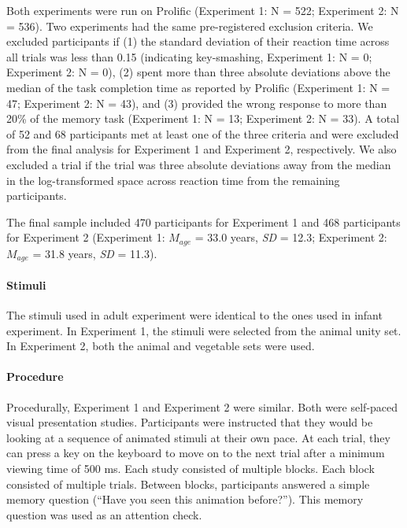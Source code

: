 \documentclass[
]{article}
\begin{document}
Both experiments were run on Prolific (Experiment 1: N = 522; Experiment 2: N = 536). Two experiments had the same pre-registered exclusion criteria. We excluded participants if (1) the standard deviation of their reaction time across all trials was less than 0.15 (indicating key-smashing, Experiment 1: N = 0; Experiment 2: N = 0), (2) spent more than three absolute deviations above the median of the task completion time as reported by Prolific (Experiment 1: N = 47; Experiment 2: N = 43), and (3) provided the wrong response to more than 20\% of the memory task (Experiment 1: N = 13; Experiment 2: N = 33). A total of 52 and 68 participants met at least one of the three criteria and were excluded from the final analysis for Experiment 1 and Experiment 2, respectively. We also excluded a trial if the trial was three absolute deviations away from the median in the log-transformed space across reaction time from the remaining participants. 

The final sample included 470 participants for Experiment 1 and 468 participants for Experiment 2 (Experiment 1:  \(M_{age}\)  = 33.0 years, \textit{SD} = 12.3; Experiment 2:  \(M_{age}\)  = 31.8 years, \textit{SD} = 11.3). 

\hypertarget{stimuli-1}{%
\paragraph{Stimuli}\label{stimuli-1}}

The stimuli used in adult experiment were identical to the ones used in infant experiment. In Experiment 1, the stimuli were selected from the animal unity set. In Experiment 2, both the animal and vegetable sets were used.

\hypertarget{procedure-1}{%
\paragraph{Procedure}\label{procedure-1}}

Procedurally, Experiment 1 and Experiment 2 were similar. Both were self-paced visual presentation studies. Participants were instructed that they would be looking at a sequence of animated stimuli at their own pace. At each trial, they can press a key on the keyboard to move on to the next trial after a minimum viewing time of 500 ms. Each study consisted of multiple blocks. Each block consisted of multiple trials. Between blocks, participants answered a simple memory question (``Have you seen this animation before?''). This memory question was used as an attention check.
\end{document}
